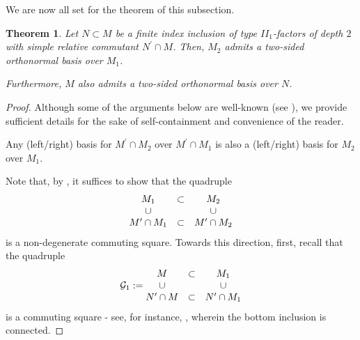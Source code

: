 \documentclass{amsart}
\newtheorem{theorem}{Theorem}[section]
\theoremstyle{definition}
\theoremstyle{theorem}
\begin{document}
We are now all set for the theorem of this subsection.

\begin{theorem}\label{two-sided-depth-2}
  Let $N\subset M$ be a finite index inclusion of type $II_1$-factors
  of depth $2$ with simple relative commutant $N^{\prime}\cap
  M$. Then, $M_2$ admits a two-sided orthonormal basis over $M_1$.

 Furthermore, $M$ also admits a two-sided orthonormal basis over $N$.
\end{theorem}
\begin{proof} 
  Although some of the arguments below are well-known (see \cite{pop2}),
we provide sufficient details for the sake of self-containment and
convenience of the reader. \medskip


   Any (left/right) basis for $M^{\prime}\cap M_2$
over $M^{\prime}\cap M_1$ is also a (left/right) basis for $M_2$ over $M_1$.  \medskip

Note that, by , it suffices to show that 
the quadruple
$$
\begin{matrix}
  M_1 &\subset & M_2 \cr \cup &\ &\cup\cr M^{\prime}\cap M_1 &\subset & M^{\prime}\cap M_2
\end{matrix}
$$
is  a non-degenerate commuting square.  Towards this direction, first, recall that the quadruple
\[
\mathcal{G}_1 := \begin{matrix} M &\subset & M_1 \cr
  \cup &\ &\cup\cr N^{\prime}\cap M &\subset & N^{\prime}\cap M_1
\end{matrix}
\]
is a commuting square - see, for instance, \cite[Proposition 4.2.7]{GHJ},
wherein the bottom inclusion is connected.


\end{proof}
\end{document}
